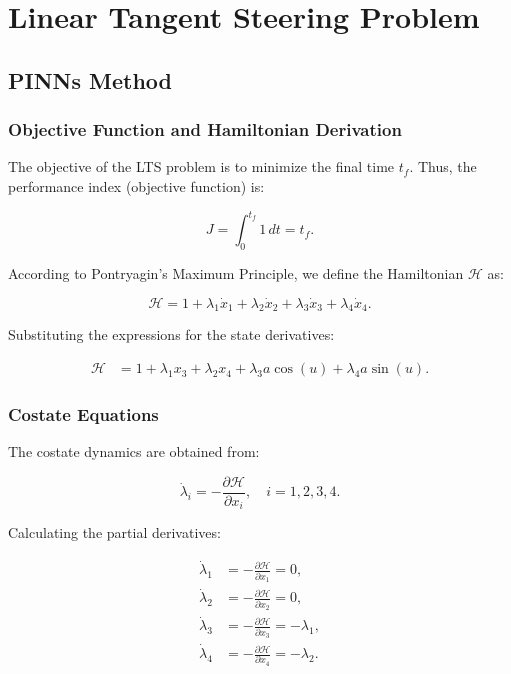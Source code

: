 \section{Linear Tangent Steering Problem}
\subsection{PINNs Method}
\subsubsection*{Objective Function and Hamiltonian Derivation}

The objective of the LTS problem is to minimize the final time \( t_f \). Thus, the performance index (objective function) is:

\[
J = \int_{0}^{t_f} 1 \, dt = t_f.
\]

According to Pontryagin’s Maximum Principle, we define the Hamiltonian \( \mathcal{H} \) as:

\[
\mathcal{H} = 1 + \lambda_1 \dot{x}_1 + \lambda_2 \dot{x}_2 + \lambda_3 \dot{x}_3 + \lambda_4 \dot{x}_4.
\]

Substituting the expressions for the state derivatives:

\[
\begin{aligned}
\mathcal{H} &= 1 + \lambda_1 x_3 + \lambda_2 x_4 + \lambda_3 a \cos(u) + \lambda_4 a \sin(u).
\end{aligned}
\]

\subsubsection*{Costate Equations}

The costate dynamics are obtained from:

\[
\dot{\lambda}_i = -\frac{\partial \mathcal{H}}{\partial x_i}, \quad i = 1,2,3,4.
\]

Calculating the partial derivatives:

\[
\begin{aligned}
\dot{\lambda}_1 &= -\frac{\partial \mathcal{H}}{\partial x_1} = 0, \\
\dot{\lambda}_2 &= -\frac{\partial \mathcal{H}}{\partial x_2} = 0, \\
\dot{\lambda}_3 &= -\frac{\partial \mathcal{H}}{\partial x_3} = -\lambda_1, \\
\dot{\lambda}_4 &= -\frac{\partial \mathcal{H}}{\partial x_4} = -\lambda_2.
\end{aligned}
\]

